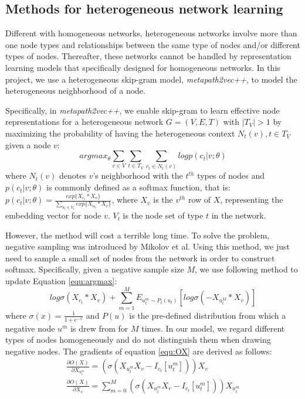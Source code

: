 \documentclass[conference]{IEEEtran}
\begin{document}
\subsection*{Methods for heterogeneous network learning}
Different with homogeneous networks, heterogeneous networks involve more than one node types and relationships between the same type of nodes and/or different types of nodes. Thereafter, these networks cannot be handled by representation learning models that specifically designed for homogeneous networks. In this project, we use a heterogeneous skip-gram model, \emph{metapath2vec++}\cite{dong2017metapath2vec}, to model the heterogeneous neighborhood of a node.

Specifically, in \emph{metapath2vec++}, we enable skip-gram to learn effective node representations for a heterogeneous network $G=(V,E,T)$ with $|T_V|>1$ by maximizing the probability of having the heterogeneous context $N_t(v),t\in T_V$ given a node $v$:
\begin{equation}
	arg max_{\theta}\sum_{v\in V}\sum_{t\in T_V}\sum_{c_t\in N_t(v)} log p(c_t|v;\theta)
\label{equ:argmax}
\end{equation}
where $N_t(v)$ denotes $v$'s neighborhood with the $t^{th}$ types of nodes and $p(c_t|v;\theta)$ is commonly defined as a softmax function, that is: $p(c_t|v;\theta)=\frac{exp\{X_{c_t}*X_v\}}{\sum_{u_t\in V_t}exp\{X_{u_t}*X_v\}}$, where $X_v$ is the $v^{th}$ row of $X$, representing the embedding vector for node $v$. $V_t$ is the node set of type $t$ in the network.

However, the method will cost a terrible long time. To solve the problem, negative sampling was introduced by Mikolov et al\cite{mikolov2013distributed}. Using this method, we just need to sample a small set of nodes from the network in order to construct softmax. Specifically, given a negative sample size $M$, we use following method to update Equation \ref{equ:argmax}:
\begin{equation}
log \sigma(X_{c_t}*X_v)+\sum_{m=1}^M E_{u_t^m\sim P_t(u_t)}[log \sigma(-X_{u_t^M}*X_v)]
\label{equ:OX}
\end{equation}
where $\sigma(x)=\frac{1}{1+e^{-x}}$ and $P(u)$ is the pre-defined distribution from which a negative node $u^m$ is drew from for $M$ times. In our model, we regard different types of nodes homogeneously and do not distinguish them when drawing negative nodes. The gradients of equation \ref{equ:OX} are derived as follows:
\begin{equation}\label{equ:gradient}
\begin{split}
\frac{\partial O(X)}{\partial X_{u_t^m}}=(\sigma(X_{u_t^m}X_v-I_{c_t}[u_t^m]))X_v\\
\frac{\partial O(X)}{\partial X_v}=\sum_{m=0}^M(\sigma(X_{u_t^m}X_v-I_{c_t}[u_t^m]))X_{u_t^m}
\end{split}
\end{equation}
\end{document}
